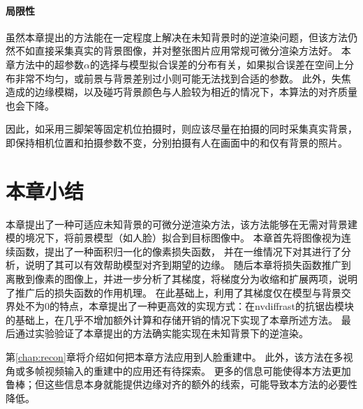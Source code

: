 \paragraph{局限性}

虽然本章提出的方法能在一定程度上解决在未知背景时的逆渲染问题，但该方法仍然不如直接采集真实的背景图像，并对整张图片应用常规可微分渲染方法好。
本章方法中的超参数$\alpha$的选择与模型拟合误差的分布有关，如果拟合误差在空间上分布非常不均匀，或前景与背景差别过小则可能无法找到合适的参数。
此外，失焦造成的边缘模糊，以及碰巧背景颜色与人脸较为相近的情况下，本算法的对齐质量也会下降。

因此，如采用三脚架等固定机位拍摄时，则应该尽量在拍摄的同时采集真实背景，即保持相机位置和拍摄参数不变，分别拍摄有人在画面中的和仅有背景的照片。

\section*{本章小结}

本章提出了一种可适应未知背景的可微分逆渲染方法，该方法能够在无需对背景建模的境况下，将前景模型（如人脸）拟合到目标图像中。
本章首先将图像视为连续函数，提出了一种面积归一化的像素损失函数，
并在一维情况下对其进行了分析，说明了其可以有效帮助模型对齐到期望的边缘。
随后本章将损失函数推广到离散到像素的图像上，并进一步分析了其梯度，将梯度分为收缩和扩展两项，说明了推广后的损失函数的作用机理。
在此基础上，利用了其梯度仅在模型与背景交界处不为0的特点，本章提出了一种更高效的实现方式：在nvdiffrast的抗锯齿模块的基础上，在几乎不增加额外计算和存储开销的情况下实现了本章所述方法。
最后通过实验验证了本章提出的方法确实能实现在未知背景下的逆渲染。

第\ref{chap:recon}章将介绍如何把本章方法应用到人脸重建中。
此外，该方法在多视角或多帧视频输入的重建中的应用还有待探索。
更多的信息可能使得本方法更加鲁棒；但这些信息本身就能提供边缘对齐的额外的线索，可能导致本方法的必要性降低。
